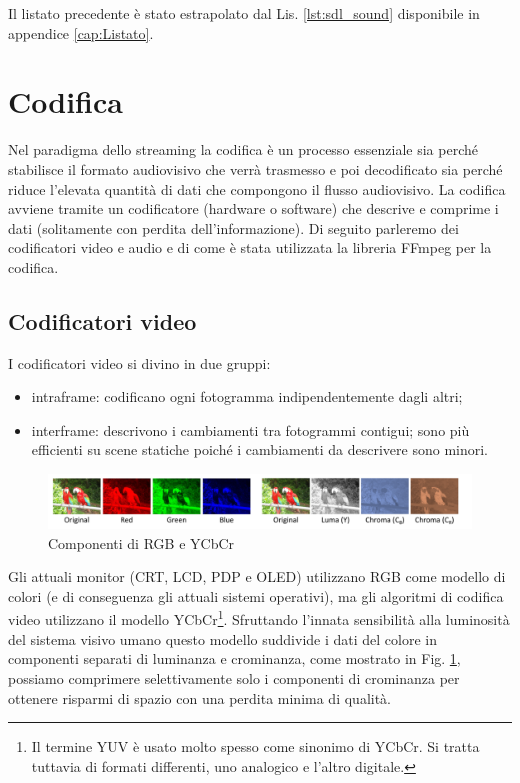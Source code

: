 Il listato precedente è stato estrapolato dal Lis. \ref{lst:sdl_sound} disponibile in appendice \ref{cap:Listato}.




\section{Codifica} \label{sec:cap3_Codifica}
Nel paradigma dello streaming la codifica è un processo essenziale sia perché stabilisce il formato audiovisivo che verrà trasmesso e poi decodificato sia perché riduce l'elevata quantità di dati che compongono il flusso audiovisivo. La codifica avviene tramite un codificatore (hardware o software) che descrive e comprime i dati (solitamente con perdita dell'informazione). Di seguito parleremo dei codificatori video e audio e di come è stata utilizzata la libreria FFmpeg per la codifica.

\subsection{Codificatori video}
I codificatori video si divino in due gruppi:

\begin{itemize}
	\item intraframe: codificano ogni fotogramma indipendentemente dagli altri;
	\item interframe: descrivono i cambiamenti tra fotogrammi contigui; sono più efficienti su scene statiche poiché i cambiamenti da descrivere sono minori.
\end{itemize}

\begin{figure}[H]
	\includegraphics[width=\linewidth]{immagini/RGB_YCbCr}
	\caption{Componenti di RGB e YCbCr}
	\label{fig:RGB_YCbCr}
\end{figure}

Gli attuali monitor (CRT, LCD, PDP e OLED) utilizzano RGB come modello di colori (e di conseguenza gli attuali sistemi operativi), ma gli algoritmi di codifica video utilizzano il modello YCbCr\footnote{Il termine YUV è usato molto spesso come sinonimo di YCbCr. Si tratta tuttavia di formati differenti, uno analogico e l'altro digitale.}. Sfruttando l'innata sensibilità alla luminosità del sistema visivo umano questo modello suddivide i dati del colore in componenti separati di luminanza e crominanza, come mostrato in Fig. \ref{fig:RGB_YCbCr}, possiamo comprimere selettivamente solo i componenti di crominanza per ottenere risparmi di spazio con una perdita minima di qualità.

